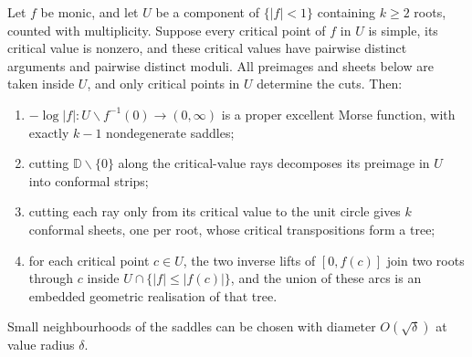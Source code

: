 \hypertarget{inverse-sheet-component}{}
\begin{remark}
\label{res:attachment-aware-reeb}
Let $f$ be monic, and let $U$ be a component of $\{|f|<1\}$ containing
$k\ge2$ roots, counted with multiplicity. Suppose every critical point of
$f$ in $U$ is simple, its critical value is nonzero, and these critical
values have pairwise distinct arguments and pairwise distinct moduli.
All preimages and sheets below are taken inside $U$, and only critical
points in $U$ determine the cuts. Then:
\begin{enumerate}
\item $-\log|f|:U\mathbin{\backslash}f^{-1}(0)\to(0,\infty)$ is a proper excellent
Morse function, with exactly $k-1$ nondegenerate saddles;
\item cutting $\mathbb D\smallsetminus\{0\}$ along the critical-value rays
decomposes its preimage in $U$ into conformal strips;
\item cutting each ray only from its critical value to the unit circle gives
$k$ conformal sheets, one per root, whose critical transpositions form a tree;
\item for each critical point $c\in U$, the two inverse lifts of
$[0,f(c)]$ join two roots through $c$ inside
$U\cap\{|f|\le|f(c)|\}$, and the union of these arcs is an embedded
geometric realisation of that tree.
\end{enumerate}
Small neighbourhoods of the saddles can be chosen with diameter
$O(\sqrt\delta)$ at value radius $\delta$.
\end{remark}

